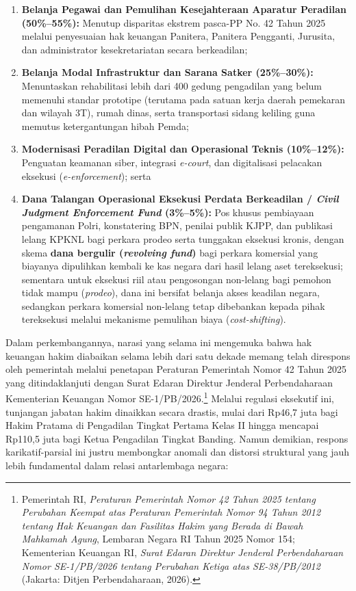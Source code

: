 \documentclass[12pt,a4paper,twocolumn]{article}
\begin{document}
\begin{enumerate}
    \item \textbf{Belanja Pegawai dan Pemulihan Kesejahteraan Aparatur Peradilan (50\%--55\%):} Menutup disparitas ekstrem pasca-PP No. 42 Tahun 2025 melalui penyesuaian hak keuangan Panitera, Panitera Pengganti, Jurusita, dan administrator kesekretariatan secara berkeadilan;
    \item \textbf{Belanja Modal Infrastruktur dan Sarana Satker (25\%--30\%):} Menuntaskan rehabilitasi lebih dari 400 gedung pengadilan yang belum memenuhi standar prototipe (terutama pada satuan kerja daerah pemekaran dan wilayah 3T), rumah dinas, serta transportasi sidang keliling guna memutus ketergantungan hibah Pemda;
    \item \textbf{Modernisasi Peradilan Digital dan Operasional Teknis (10\%--12\%):} Penguatan keamanan siber, integrasi \textit{e-court}, dan digitalisasi pelacakan eksekusi (\textit{e-enforcement}); serta
    \item \textbf{Dana Talangan Operasional Eksekusi Perdata Berkeadilan / \textit{Civil Judgment Enforcement Fund} (3\%--5\%):} Pos khusus pembiayaan pengamanan Polri, konstatering BPN, penilai publik KJPP, dan publikasi lelang KPKNL bagi perkara prodeo serta tunggakan eksekusi kronis, dengan skema \textbf{dana bergulir (\textit{revolving fund})} bagi perkara komersial yang biayanya dipulihkan kembali ke kas negara dari hasil lelang aset tereksekusi; sementara untuk eksekusi riil atau pengosongan non-lelang bagi pemohon tidak mampu (\textit{prodeo}), dana ini bersifat belanja akses keadilan negara, sedangkan perkara komersial non-lelang tetap dibebankan kepada pihak tereksekusi melalui mekanisme pemulihan biaya (\textit{cost-shifting}).
\end{enumerate}

Dalam perkembangannya, narasi yang selama ini mengemuka bahwa hak keuangan hakim diabaikan selama lebih dari satu dekade memang telah direspons oleh pemerintah melalui penetapan Peraturan Pemerintah Nomor 42 Tahun 2025 yang ditindaklanjuti dengan Surat Edaran Direktur Jenderal Perbendaharaan Kementerian Keuangan Nomor SE-1/PB/2026.\footnote{Pemerintah RI, \textit{Peraturan Pemerintah Nomor 42 Tahun 2025 tentang Perubahan Keempat atas Peraturan Pemerintah Nomor 94 Tahun 2012 tentang Hak Keuangan dan Fasilitas Hakim yang Berada di Bawah Mahkamah Agung}, Lembaran Negara RI Tahun 2025 Nomor 154; Kementerian Keuangan RI, \textit{Surat Edaran Direktur Jenderal Perbendaharaan Nomor SE-1/PB/2026 tentang Perubahan Ketiga atas SE-38/PB/2012} (Jakarta: Ditjen Perbendaharaan, 2026).} Melalui regulasi eksekutif ini, tunjangan jabatan hakim dinaikkan secara drastis, mulai dari Rp46,7 juta bagi Hakim Pratama di Pengadilan Tingkat Pertama Kelas II hingga mencapai Rp110,5 juta bagi Ketua Pengadilan Tingkat Banding. Namun demikian, respons karikatif-parsial ini justru membongkar anomali dan distorsi struktural yang jauh lebih fundamental dalam relasi antarlembaga negara:
\end{document}
